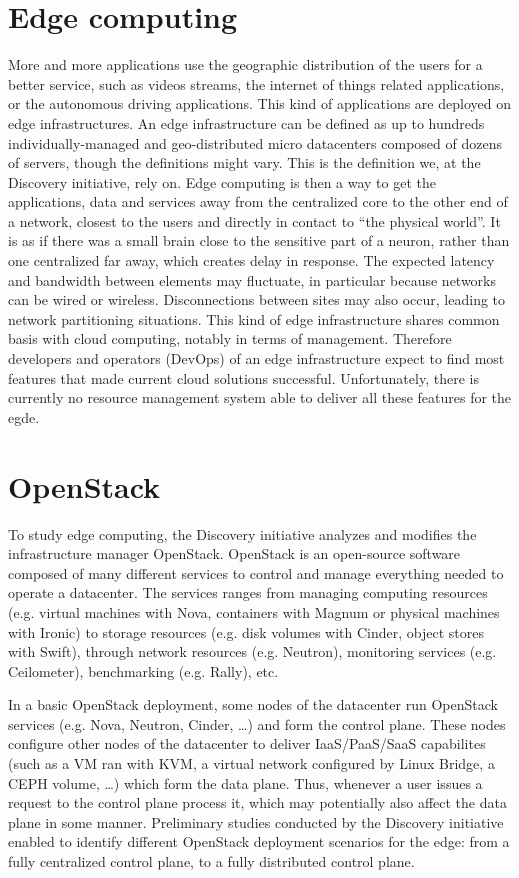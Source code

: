 \section{Edge computing}

More and more applications use the geographic distribution of the users for a better service, such as videos streams, the internet of things related applications, or the autonomous driving applications. This kind of applications are deployed on edge infrastructures. An edge infrastructure can be defined as up to hundreds individually-managed and geo-distributed micro datacenters composed of dozens of servers, though the definitions might vary. This is the definition we, at the Discovery initiative, rely on. Edge computing is then a way to get the applications, data and services away from the centralized core to the other end of a network, closest to the users and directly in contact to ``the physical world''. It is as if there was a small brain close to the sensitive part of a neuron, rather than one centralized far away, which creates delay in response. The expected latency and bandwidth between elements may fluctuate, in particular because networks can be wired or wireless. Disconnections between sites may also occur, leading to network partitioning situations. This kind of edge infrastructure shares common basis with cloud computing, notably in terms of management. Therefore developers and operators (DevOps) of an edge infrastructure expect to find most features that made current cloud solutions successful. Unfortunately, there is currently no resource management system able to deliver all these features for the egde\cite{cherrueau:hal-01812747}.

\section{OpenStack}

To study edge computing, the Discovery initiative analyzes and modifies the infrastructure manager OpenStack. OpenStack is an open-source software composed of many different services to control and manage everything needed to operate a datacenter. The services ranges from managing computing resources (e.g. virtual machines with Nova, containers with Magnum or physical machines with Ironic) to storage resources (e.g. disk volumes with Cinder, object stores with Swift), through network resources (e.g. Neutron), monitoring services (e.g. Ceilometer), benchmarking (e.g. Rally), etc.


In a basic OpenStack deployment, some nodes of the datacenter run OpenStack services (e.g. Nova, Neutron, Cinder, \dots) and form the control plane. These nodes configure other nodes of the datacenter to deliver IaaS/PaaS/SaaS capabilites (such as a VM ran with KVM, a virtual network configured by Linux Bridge, a CEPH volume, \dots) which form the data plane. Thus, whenever a user issues a request to the control plane process it, which  may potentially also affect the data plane in some manner. Preliminary studies conducted by the Discovery initiative enabled to identify different OpenStack deployment scenarios for the edge: from a fully centralized control plane, to a fully distributed control plane\cite{cherrueau:hal-01812747}.

